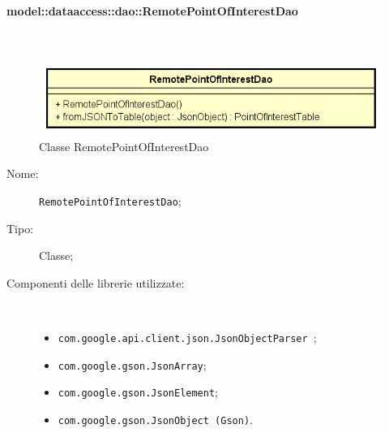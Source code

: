 \documentclass[../DefinizioneDiProdotto.tex]{subfiles}
\begin{document}
\paragraph{model::dataaccess::dao::RemotePointOfInterestDao}
\
\begin{figure}[H]
	\centering
	\includegraphics[width=\maxwidth]{img/RemotePointOfInterestDao.png}
	\caption{Classe RemotePointOfInterestDao}\label{fig:model::dataaccess::dao::RemotePointOfInterestDao} 
\end{figure}
\begin{description}
	\item[Nome:] \texttt{RemotePointOfInterestDao};
	\item[Tipo:] Classe;
	\item[Componenti delle librerie utilizzate:] \
	\begin{itemize}
		\item \texttt{com.google.api.client.json.JsonObjectParser
		};
		
		\item \texttt{com.google.gson.JsonArray};
		
		\item \texttt{com.google.gson.JsonElement};
		
		\item \texttt{com.google.gson.JsonObject (Gson)}.
		

\end{itemize}
\end{description}
\end{document}
